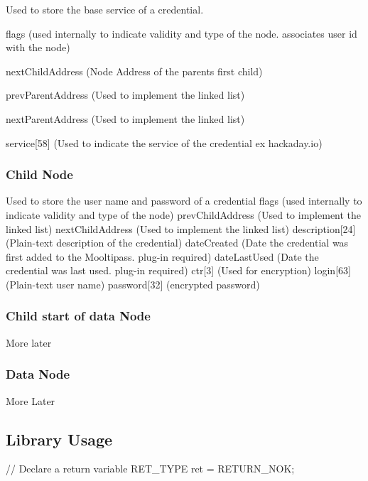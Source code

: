 Used to store the base \textquotesingle{}service\textquotesingle{} of a credential.
\begin{DoxyItemize}
\item flags (used internally to indicate validity and type of the node. associates user id with the node)
\item next\+Child\+Address (Node Address of the parents first child)
\item prev\+Parent\+Address (Used to implement the linked list)
\item next\+Parent\+Address (Used to implement the linked list)
\item service\mbox{[}58\mbox{]} (Used to indicate the \textquotesingle{}service\textquotesingle{} of the credential ex \textquotesingle{}hackaday.\+io\textquotesingle{})
\end{DoxyItemize}

\subsubsection*{Child Node}

Used to store the user name and password of a credential flags (used internally to indicate validity and type of the node) prev\+Child\+Address (Used to implement the linked list) next\+Child\+Address (Used to implement the linked list) description\mbox{[}24\mbox{]} (Plain-\/text description of the credential) date\+Created (Date the credential was first added to the Mooltipass. plug-\/in required) date\+Last\+Used (Date the credential was last used. plug-\/in required) ctr\mbox{[}3\mbox{]} (Used for encryption) login\mbox{[}63\mbox{]} (Plain-\/text user name) password\mbox{[}32\mbox{]} (encrypted password)

\subsubsection*{Child start of data Node}

More later \subsubsection*{Data Node}

More Later

\subsection*{Library Usage}

// Declare a return variable R\+E\+T\+\_\+\+T\+Y\+PE ret = R\+E\+T\+U\+R\+N\+\_\+\+N\+OK;

